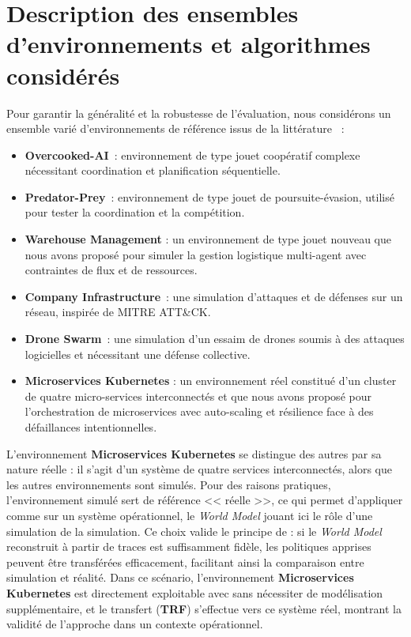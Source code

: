 \section{Description des ensembles d'environnements et algorithmes considérés}

Pour garantir la généralité et la robustesse de l'évaluation, nous considérons un ensemble varié d'environnements de référence issus de la littérature ~:
\begin{itemize}
  \item \textbf{Overcooked-AI}~\cite{overcookedai}: environnement de type jouet coopératif complexe nécessitant coordination et planification séquentielle.
  \item \textbf{Predator-Prey}~\cite{lowe2017multi}: environnement  de type jouet de poursuite-évasion, utilisé pour tester la coordination et la compétition.
  \item \textbf{Warehouse Management} : un environnement  de type jouet nouveau que nous avons proposé pour simuler la gestion logistique multi-agent avec contraintes de flux et de ressources.
  \item \textbf{Company Infrastructure}~\cite{cyberbattlesim}: une simulation d'attaques et de défenses sur un réseau, inspirée de MITRE ATT\&CK.
  \item \textbf{Drone Swarm}~\cite{cage_challenge_3_announcement}: une simulation d'un essaim de drones soumis à des attaques logicielles et nécessitant une défense collective.
  \item \textbf{Microservices Kubernetes} : un environnement réel constitué d'un cluster de quatre micro-services interconnectés et que nous avons proposé pour l'orchestration de microservices avec auto-scaling et résilience face à des défaillances intentionnelles.
\end{itemize}

L'environnement \textbf{Microservices Kubernetes} se distingue des autres par sa nature réelle : il s'agit d'un système de quatre services interconnectés, alors que les autres environnements sont simulés. Pour des raisons pratiques, l'environnement simulé sert de référence << réelle >>, ce qui permet d'appliquer  comme sur un système opérationnel, le \textit{World Model} jouant ici le rôle d'une simulation de la simulation. Ce choix valide le principe de  : si le \textit{World Model} reconstruit à partir de traces est suffisamment fidèle, les politiques apprises peuvent être transférées efficacement, facilitant ainsi la comparaison entre simulation et réalité. Dans ce scénario, l'environnement \textbf{Microservices Kubernetes} est directement exploitable avec  sans nécessiter de modélisation supplémentaire, et le transfert (\textbf{TRF}) s'effectue vers ce système réel, montrant la validité de l'approche dans un contexte opérationnel.

